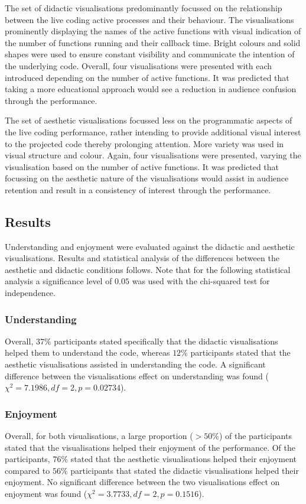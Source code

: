 \documentclass{sig-alternate}
\begin{document}
The set of didactic visualisations predominantly focussed on the relationship between the live coding active processes and their behaviour. The visualisations prominently displaying the names of the active functions with visual indication of the number of functions running and their callback time. Bright colours and solid shapes were used to ensure constant visibility and communicate the intention of the underlying code. Overall, four visualisations were presented with each introduced depending on the number of active functions. It was predicted that taking a more educational approach would see a reduction in audience confusion through the performance.

The set of aesthetic visualisations focussed less on the programmatic aspects of the live coding performance, rather intending to provide additional visual interest to the projected code thereby prolonging attention. More variety was used in visual structure and colour. Again, four visualisations were presented, varying the visualisation based on the number of active functions. It was predicted that focussing on the aesthetic nature of the visualisations would assist in audience retention and result in a consistency of interest through the performance.

\subsection{Results}

Understanding and enjoyment were evaluated against the didactic and aesthetic visualisations. Results and statistical analysis of the differences between the aesthetic and didactic conditions follows. Note that for the following statistical analysis a significance level of $0.05$ was used with the chi-squared test for independence.

\subsubsection{Understanding}

Overall, $37\%$ participants stated specifically that the didactic visualisations helped them to understand the code, whereas $12\%$ participants stated that the aesthetic visualisations assisted in understanding the code. A significant difference between the visualisations effect on understanding was found ($\chi^2=7.1986,df=2,p=0.02734$).

\subsubsection{Enjoyment}
Overall, for both visualisations, a large proportion ($> 50\%$) of the participants stated that the visualisations helped their enjoyment of the performance. Of the participants, $76\%$ stated that the aesthetic visualisations helped their enjoyment compared to $56\%$ participants that stated the didactic visualisations helped their enjoyment. No significant difference between the two visualisations effect on enjoyment was found ($\chi^2=3.7733,df=2,p=0.1516$).
\end{document}
